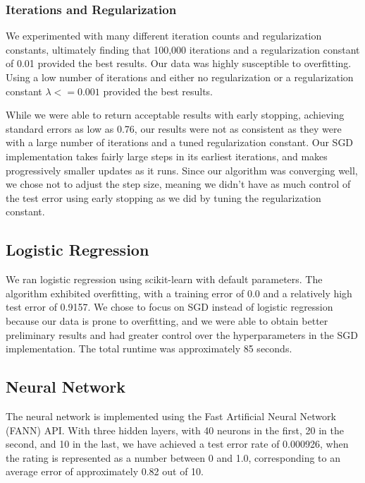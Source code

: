 \documentclass[journal]{IEEEtran}
\begin{document}
\subsubsection{Iterations and Regularization}
We experimented with many different iteration counts and regularization constants, ultimately finding that 100,000 iterations and a regularization constant of 0.01 provided the best results.  Our data was highly susceptible to overfitting.  Using a low number of iterations and either no regularization or a regularization constant $ \lambda <= 0.001 $  provided the best results.


While we were able to return acceptable results with early stopping, achieving standard errors as low as 0.76, our results were not as consistent as they were with a large number of iterations and a tuned regularization constant.  Our SGD implementation takes fairly large steps in its earliest iterations, and makes progressively smaller updates as it runs.  Since our algorithm was converging well, we chose not to adjust the step size, meaning we didn't have as much control of the test error using early stopping as we did by tuning the regularization constant.

\subsection{Logistic Regression}

We ran logistic regression using scikit-learn with default parameters.  The algorithm exhibited overfitting, with a training error of 0.0 and a relatively high test error of 0.9157.  We chose to focus on SGD instead of logistic regression because our data is prone to overfitting, and we were able to obtain better preliminary results and had greater control over the hyperparameters in the SGD implementation.  The total runtime was approximately 85 seconds.

\subsection{Neural Network}
The neural network is implemented using the Fast Artificial Neural Network (FANN)
API.  With three hidden layers, with 40 neurons in the first, 20 in the second, and 10 in the last,
we have achieved a test error rate of 0.000926, when the rating is represented as a
number between 0 and 1.0, corresponding to an average error of approximately 0.82 out of 10.
\end{document}
